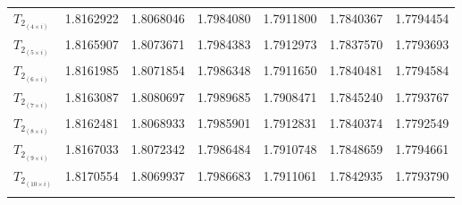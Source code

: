 \begin{table*}[t!]
\begin{tabular}{l*{6}{c}}
        $T_{2_{(4 \times i)}}$                                                & 1.8162922 & 1.8068046          & 1.7984080          & 1.7911800 & 1.7840367 & 1.7794454                  \\[+0.5ex]
        $T_{2_{(5 \times i)}}$                                                & 1.8165907 & 1.8073671          & 1.7984383          & 1.7912973 & 1.7837570 & 1.7793693                  \\[+0.5ex]
        $T_{2_{(6 \times i)}}$                                                & 1.8161985 & 1.8071854          & 1.7986348          & 1.7911650 & 1.7840481 & 1.7794584                  \\[+0.5ex]
        $T_{2_{(7 \times i)}}$                                                & 1.8163087 & 1.8080697          & 1.7989685          & 1.7908471 & 1.7845240 & 1.7793767                  \\[+0.5ex]
        $T_{2_{(8 \times i)}}$                                                & 1.8162481 & 1.8068933          & 1.7985901          & 1.7912831 & 1.7840374 & 1.7792549                  \\[+0.5ex]
        $T_{2_{(9 \times i)}}$                                                & 1.8167033 & 1.8072342          & 1.7986484          & 1.7910748 & 1.7848659 & 1.7794661                  \\[+0.5ex]
        $T_{2_{(10\times i)}}$                                                & 1.8170554 & 1.8069937          & 1.7986683          & 1.7911061 & 1.7842935 & 1.7793790                  \\[+0.5ex]
        \hline \\[-1.5ex]
    \end{tabular}
\end{table*}
